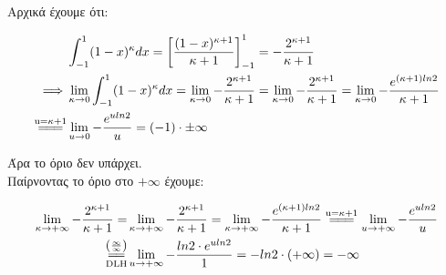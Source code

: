 \setcounter{equation}{0}

\question \textgreek{Αρχικά έχουμε ότι: }

\begin{center}
        
\begin{align*}
    &\int_{-1}^{1}(1-x)^\kappa dx = \left[\frac{(1-x)^{\kappa+1}}{\kappa+1}\right]_{-1}^{1} = -\frac{2^{\kappa+1}}{\kappa+1}\\
    \implies &\lim_{\kappa\to0}\int_{-1}^{1}(1-x)^\kappa dx = \lim_{\kappa\to0}-\frac{2^{\kappa+1}}{\kappa+1} = \lim_{\kappa\to0}-\frac{2^{\kappa+1}}{\kappa+1}
    = \lim_{\kappa\to0}-\frac{e^{(\kappa+1)ln2}}{\kappa+1}\\
    \overset{\mathrm{u=\kappa+1}}{=\joinrel=\joinrel=} & \lim_{u\to0}-\frac{e^{uln2}}{u} = (-1)\cdot \pm \infty
\end{align*}
        
\textgreek{Άρα το όριο δεν υπάρχει.\\ Παίρνοντας το όριο στο $+\infty$ έχουμε: }
        
\begin{align*}
    \lim_{\kappa\to+\infty}-\frac{2^{\kappa+1}}{\kappa+1} = &\lim_{\kappa\to+\infty}-\frac{2^{\kappa+1}}{\kappa+1}
    = \lim_{\kappa\to+\infty}-\frac{e^{(\kappa+1)ln2}}{\kappa+1}
    \overset{\mathrm{u=\kappa+1}}{=\joinrel=\joinrel=}\lim_{u\to+\infty}-\frac{e^{uln2}}{u}\\
    \underset{\mathrm{DLH}}{\overset{\left(\frac{\infty}{\infty}\right)}{=\joinrel=}}&\lim_{u\to+\infty}-\frac{ln2\cdot e^{uln2}}{1} = -ln2 \cdot (+\infty) = -\infty
\end{align*}
        
\end{center}